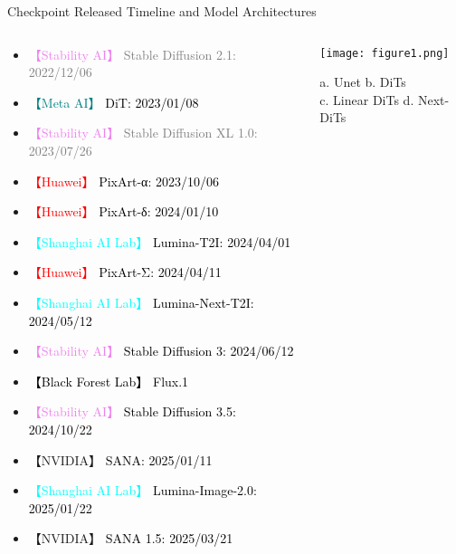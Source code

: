 \begin{refsection}
  \begin{frame}{Checkpoint Released Timeline and Model Architectures}
    \begin{columns}[T,onlytextwidth]
      \begin{column}{0.65\textwidth}
        \begin{itemize}[leftmargin=0.2em]
            \item \textcolor{violet}{【Stability AI】} \textcolor{gray}{Stable Diffusion 2.1: 2022/12/06}
            \item \textcolor{teal}{【Meta AI】} \textcolor{black}{DiT: 2023/01/08}
            \item \textcolor{violet}{【Stability AI】} \textcolor{gray}{Stable Diffusion XL 1.0: 2023/07/26}
            \item \textcolor{red}{【Huawei】} \textcolor{black}{PixArt-α: 2023/10/06}
            \item \textcolor{red}{【Huawei】} \textcolor{black}{PixArt-δ: 2024/01/10}
            \item \textcolor{cyan}{【Shanghai AI Lab】} \textcolor{black}{Lumina-T2I: 2024/04/01}
            \item \textcolor{red}{【Huawei】} \textcolor{black}{PixArt-Σ: 2024/04/11}
            \item \textcolor{cyan}{【Shanghai AI Lab】} \textcolor{black}{Lumina-Next-T2I: 2024/05/12}
            \item \textcolor{violet}{【Stability AI】} \textcolor{black}{Stable Diffusion 3: 2024/06/12}
            \item \textcolor{black}{【Black Forest Lab】} \textcolor{black}{Flux.1}
            \item \textcolor{violet}{【Stability AI】} \textcolor{black}{Stable Diffusion 3.5: 2024/10/22}
            \item \textcolor{green!70!black}{【NVIDIA】} \textcolor{black}{SANA: 2025/01/11}
            \item \textcolor{cyan}{【Shanghai AI Lab】} \textcolor{black}{Lumina-Image-2.0: 2025/01/22}
            \item \textcolor{green!70!black}{【NVIDIA】} \textcolor{black}{SANA 1.5: 2025/03/21}
        \end{itemize}
      \end{column}
      \begin{column}{0.35\textwidth}
        \centering
        \texttt{[image: figure1.png]}
        \vspace{0.4em}

        {\scriptsize
        a. Unet b. DiTs \\ 
        c. Linear DiTs d. Next-DiTs
        }
      \end{column}
    \end{columns}
    \bottomleftrefs
  \end{frame}
\end{refsection}

